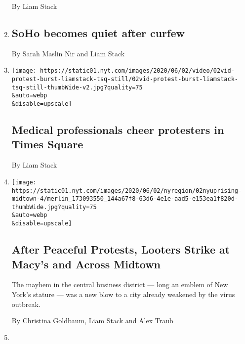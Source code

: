 \begin{enumerate}
  By Liam Stack
\item
  \href{/live/2020/protests-george-floyd-police-06-02/soho-becomes-quiet-after-curfew}{}

  \hypertarget{soho-becomes-quiet-after-curfew}{%
  \subsection{SoHo becomes quiet after
  curfew}\label{soho-becomes-quiet-after-curfew}}

  By Sarah Maslin Nir and Liam Stack
\item
  \href{/live/2020/protests-george-floyd-police-06-02/medical-professionals-cheer-protesters-in-times-square}{}

  \texttt{[image: https://static01.nyt.com/images/2020/06/02/video/02vid-protest-burst-liamstack-tsq-still/02vid-protest-burst-liamstack-tsq-still-thumbWide-v2.jpg?quality=75\\\&auto=webp\\\&disable=upscale]}

  \hypertarget{medical-professionals-cheer-protesters-in-times-square}{%
  \subsection{Medical professionals cheer protesters in Times
  Square}\label{medical-professionals-cheer-protesters-in-times-square}}

  By Liam Stack
\item
  \href{/2020/06/02/nyregion/nyc-looting-protests.html}{}

  \texttt{[image: https://static01.nyt.com/images/2020/06/02/nyregion/02nyuprising-midtown-4/merlin\_173093550\_144a67f8-63d6-4e1e-aad5-e153ea1f820d-thumbWide.jpg?quality=75\\\&auto=webp\\\&disable=upscale]}

  \hypertarget{after-peaceful-protests-looters-strike-at-macys-and-across-midtown}{%
  \subsection{After Peaceful Protests, Looters Strike at Macy's and
  Across
  Midtown}\label{after-peaceful-protests-looters-strike-at-macys-and-across-midtown}}

  The mayhem in the central business district --- long an emblem of New
  York's stature --- was a new blow to a city already weakened by the
  virus outbreak.

  By Christina Goldbaum, Liam Stack and Alex Traub
\item
  \href{/live/2020/george-floyd-protests-today-06-01/police-confront-protesters-in-front-of-radio-city-music-hall}{}


\end{enumerate}
